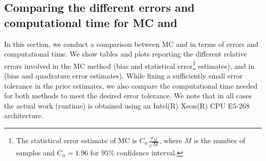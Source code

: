 %	
%
%
\FloatBarrier


\subsection{Comparing the different  errors and computational time for MC and }\label{sec:Comparing different  errors and complexity for MC and MISC}
In this section, we conduct a comparison between MC and  in terms of errors and computational time. We show tables and plots reporting  the different relative errors involved in the MC method (bias and statistical error\footnote{The statistical error estimate of MC is  $C_{\alpha} \frac{\sigma_M}{\sqrt{M}}$, where $M$ is the number of samples and $C_{\alpha}=1.96$ for $95\%$ confidence interval.}  estimates), and in  (bias and quadrature error estimates).  While fixing  a  sufficiently small error tolerance in the price estimates,  we also compare the computational time needed for both methods to meet the desired error tolerance.  We note that  in all cases the actual work (runtime) is obtained using an Intel(R) Xeon(R) CPU E$5$-$268$ architecture. 

